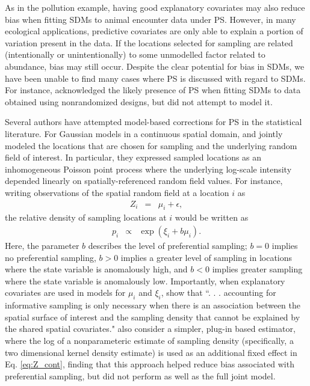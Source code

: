 \documentclass[times,mee,doublespace,]{besauth2}
\begin{document}
As in the pollution example, having good explanatory covariates may also reduce bias when fitting SDMs to animal encounter data under PS.  However, in many ecological applications, predictive covariates are only able to explain a portion of variation present in the data.  If the locations selected for sampling are related (intentionally or unintentionally) to some unmodelled factor related to abundance, bias may still occur.  Despite the clear potential for bias in SDMs, we have been unable to find many cases where PS \citep[\textit{sensu}][]{DiggleEtAl2010} is discussed with regard to SDMs.  For instance,
\citet{ChakrabortyEtAl2010} acknowledged the likely presence of PS when fitting SDMs to data obtained using nonrandomized designs, but did not attempt to model it.

Several authors have attempted model-based corrections for PS in the statistical literature. For Gaussian models in a continuous spatial domain, \citet{DiggleEtAl2010} and \citet{PatiEtAl2011} jointly modeled the locations that are chosen for sampling and the underlying random field of interest.  In particular, they expressed sampled locations as an inhomogeneous Poisson point process where the underlying log-scale intensity depended linearly on spatially-referenced random field values.  For instance, writing observations of the spatial random field at a location $i$ as
\begin{eqnarray}
   Z_i & = & \mu_i + \epsilon,
   \label{eq:Z_cont}
\end{eqnarray}
the relative density of sampling locations at $i$ would be written as
\begin{eqnarray}
   p_i & \propto & \exp(\xi_i + b \mu_i).
   \label{eq:p_cont}
\end{eqnarray}
Here, the parameter $b$ describes the level of preferential sampling; $b=0$ implies no preferential sampling, $b>0$ implies a greater level of sampling in locations where the state variable is anomalously high, and $b<0$ implies greater sampling where the state variable is anomalously low.  Importantly, when explanatory covariates are used in models for $\mu_i$ and $\xi_i$, \citet{PatiEtAl2011} show that ``. . . accounting for informative sampling is only necessary when there
is an association between the spatial surface of interest and the sampling density that cannot be
explained by the shared spatial covariates."  \citet{PatiEtAl2011} also consider a simpler, plug-in based estimator, where the log of a nonparameteric estimate of sampling density (specifically, a two dimensional kernel density estimate) is used as an additional fixed effect in Eq. \ref{eq:Z_cont}, finding that this approach helped reduce bias associated with preferential sampling, but did not perform as well as the full joint model.
\end{document}

